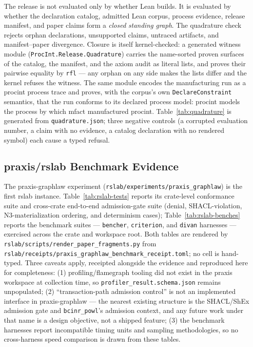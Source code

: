 \documentclass[11pt]{article}
\newif\ifreleasebuild
\begin{document}
The release is not evaluated only by whether Lean builds. It is evaluated
by whether the declaration catalog, admitted Lean corpus, process
evidence, release manifest, and paper claims form a \emph{closed standing
graph}. The quadrature check rejects orphan declarations, unsupported
claims, untraced artifacts, and manifest--paper divergence. Closure is
itself kernel-checked: a generated witness module
(\texttt{ProcInt.Release.Quadrature}) carries the name-sorted proven
surfaces of the catalog, the manifest, and the axiom audit as literal
lists, and proves their pairwise equality by \texttt{rfl} --- any orphan
on any side makes the lists differ and the kernel refuses the witness.
The same module encodes the manufacturing run as a \textsf{procint}
process trace and proves, with the corpus's own \texttt{DeclareConstraint}
semantics, that the run conforms to its declared process model:
\textsf{procint} models the process by which \textsf{mfact} manufactured
\textsf{procint}. Table~\ref{tab:quadrature} is generated from
\texttt{quadrature.json}; three negative controls (a corrupted evaluation
number, a claim with no evidence, a catalog declaration with no rendered
symbol) each cause a typed refusal.

\ifreleasebuild
  
\else
\fi

\subsection{praxis/rslab Benchmark Evidence}
\label{sec:rslab_benchmark}

The praxis-graphlaw experiment (\texttt{rslab/experiments/praxis\_graphlaw})
is the first rslab instance. Table~\ref{tab:rslab-tests} reports its
crate-level conformance suite and cross-crate end-to-end admission-gate
suite (denial, SHACL-violation, N3-materialization ordering, and
determinism cases); Table~\ref{tab:rslab-benches} reports the benchmark
suites --- \texttt{bencher}, \texttt{criterion}, and \texttt{divan}
harnesses --- exercised across the crate and workspace root. Both tables
are rendered by \texttt{rslab/scripts/render\_paper\_fragments.py} from
\texttt{rslab/receipts/praxis\_graphlaw\_benchmark\_receipt.toml}; no
cell is hand-typed. Three caveats apply, receipted alongside the evidence
and reproduced here for completeness: (1) profiling/flamegraph tooling
did not exist in the praxis workspace at collection time, so
\texttt{profiler\_result.schema.json} remains unpopulated; (2)
``transaction-path admission control'' is not an implemented interface in
praxis-graphlaw --- the nearest existing structure is the SHACL/ShEx
admission gate and \texttt{bcinr\_powl}'s admission context, and any
future work under that name is a design objective, not a shipped
feature; (3) the benchmark harnesses report incompatible timing units and
sampling methodologies, so no cross-harness speed comparison is drawn
from these tables.
\end{document}
